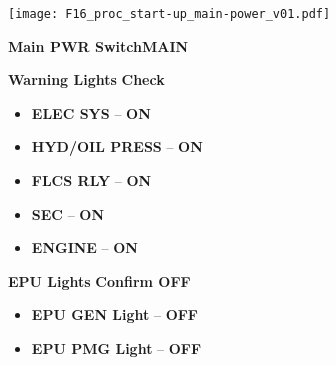 \begin{checklistenumerate}
{{        \texttt{[image: F16\_proc\_start-up\_main-power\_v01.pdf]}
        \label{fig:proc:prestart:mainpower}
    }
    \begin{subenumerate}
        \item \textbf{Main PWR Switch}\cbstart \dotfill \textbf{MAIN}\cbend
        \item \textbf{Warning Lights} \dotfill \textbf{Check}
        \begin{itemize}
            \item \textbf{ELEC SYS} -- \textbf{ON}
            \item \textbf{HYD/OIL PRESS} -- \textbf{ON}
            \item \textbf{FLCS RLY} -- \textbf{ON}
            \item \textbf{SEC} -- \textbf{ON}
            \item \textbf{ENGINE} -- \textbf{ON}
        \end{itemize}
        \item \textbf{EPU Lights} \dotfill \textbf{Confirm OFF}
        \begin{itemize}
            \item \textbf{EPU GEN Light} -- \textbf{OFF}
            \item \textbf{EPU PMG Light} -- \textbf{OFF}
        \end{itemize}
    \end{subenumerate}}
\end{checklistenumerate}

\clearpage

